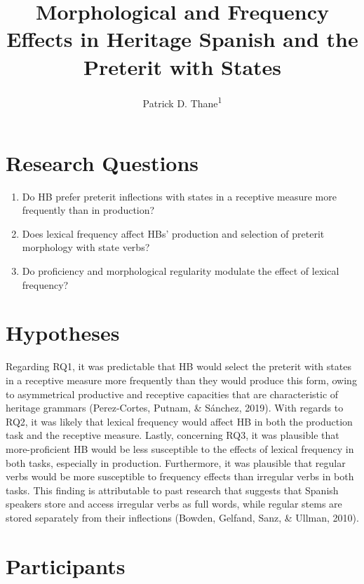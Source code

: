 \documentclass[
  english,
  man,floatsintext]{apa6}
\title{Morphological and Frequency Effects in Heritage Spanish and the Preterit with States}
\author{Patrick D. Thane\textsuperscript{1}}
\date{}
\affiliation{\vspace{0.5cm}\textsuperscript{1} Rutgers University}
\providecommand{\tightlist}{%
  \setlength{\itemsep}{0pt}\setlength{\parskip}{0pt}}
\begin{document}
\maketitle

\hypertarget{research-questions}{%
\section{Research Questions}\label{research-questions}}

\begin{enumerate}
\def\labelenumi{\arabic{enumi}.}
\tightlist
\item
  Do HB prefer preterit inflections with states in a receptive measure more frequently than in production?
\item
  Does lexical frequency affect HBs' production and selection of preterit morphology with state verbs?
\item
  Do proficiency and morphological regularity modulate the effect of lexical frequency?
\end{enumerate}

\hypertarget{hypotheses}{%
\section{Hypotheses}\label{hypotheses}}

Regarding RQ1, it was predictable that HB would select the preterit with states in a receptive measure more frequently than they would produce this form, owing to asymmetrical productive and receptive capacities that are characteristic of heritage grammars (Perez-Cortes, Putnam, \& Sánchez, 2019). With regards to RQ2, it was likely that lexical frequency would affect HB in both the production task and the receptive measure. Lastly, concerning RQ3, it was plausible that more-proficient HB would be less susceptible to the effects of lexical frequency in both tasks, especially in production. Furthermore, it was plausible that regular verbs would be more susceptible to frequency effects than irregular verbs in both tasks. This finding is attributable to past research that suggests that Spanish speakers store and access irregular verbs as full words, while regular stems are stored separately from their inflections (Bowden, Gelfand, Sanz, \& Ullman, 2010).

\hypertarget{participants}{%
\section{Participants}\label{participants}}
\end{document}
